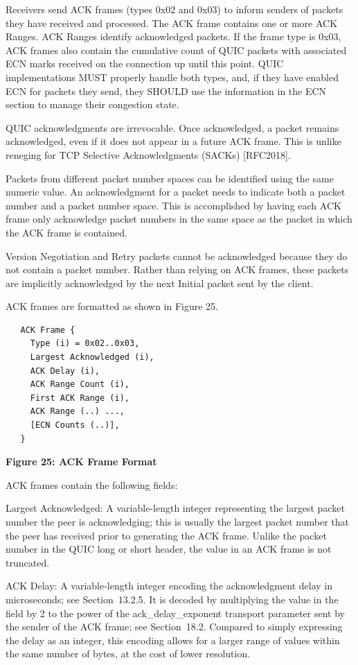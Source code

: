 \documentclass{article}
\begin{document}
Receivers send ACK frames (types 0x02 and 0x03) to inform senders of packets they have received and processed.  The ACK frame contains one or more ACK Ranges.  ACK Ranges identify acknowledged packets.  If the frame type is 0x03, ACK frames also contain the cumulative count of QUIC packets with associated ECN marks received on the connection up until this point.  QUIC implementations MUST properly handle both types, and, if they have enabled ECN for packets they send, they SHOULD use the information in the ECN section to manage their congestion state.

QUIC acknowledgments are irrevocable.  Once acknowledged, a packet remains acknowledged, even if it does not appear in a future ACK frame.  This is unlike reneging for TCP Selective Acknowledgments (SACKs) [RFC2018].

Packets from different packet number spaces can be identified using the same numeric value.  An acknowledgment for a packet needs to indicate both a packet number and a packet number space.  This is accomplished by having each ACK frame only acknowledge packet numbers in the same space as the packet in which the ACK frame is contained.

Version Negotiation and Retry packets cannot be acknowledged because they do not contain a packet number.  Rather than relying on ACK frames, these packets are implicitly acknowledged by the next Initial packet sent by the client.

ACK frames are formatted as shown in Figure 25.

\begin{verbatim}
   ACK Frame {
     Type (i) = 0x02..0x03,
     Largest Acknowledged (i),
     ACK Delay (i),
     ACK Range Count (i),
     First ACK Range (i),
     ACK Range (..) ...,
     [ECN Counts (..)],
   }
\end{verbatim}

\begin{center}
\textbf{Figure 25: ACK Frame Format}
\end{center}

ACK frames contain the following fields:

Largest Acknowledged:  A variable-length integer representing the largest packet number the peer is acknowledging; this is usually the largest packet number that the peer has received prior to generating the ACK frame.  Unlike the packet number in the QUIC long or short header, the value in an ACK frame is not truncated.

ACK Delay:  A variable-length integer encoding the acknowledgment delay in microseconds; see Section~13.2.5.  It is decoded by multiplying the value in the field by 2 to the power of the ack\_delay\_exponent transport parameter sent by the sender of the ACK frame; see Section~18.2.  Compared to simply expressing the delay as an integer, this encoding allows for a larger range of values within the same number of bytes, at the cost of lower resolution.
\end{document}
